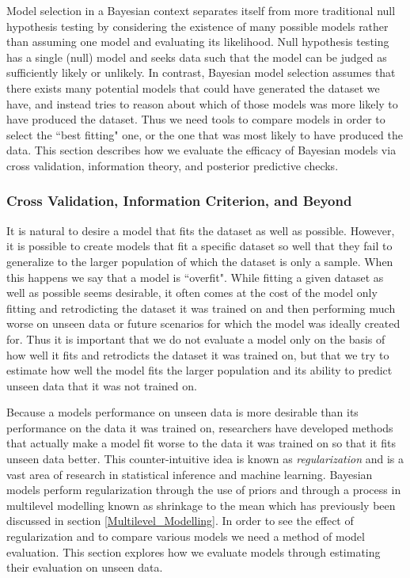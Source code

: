Model selection in a Bayesian context separates itself from more traditional null hypothesis testing by considering the existence of many possible models rather than assuming one model and evaluating its likelihood. Null hypothesis testing has a single (null) model and seeks data such that the model can be judged as sufficiently likely or unlikely. In contrast, Bayesian model selection assumes that there exists many potential models that could have generated the dataset we have, and instead tries to reason about which of those models was more likely to have produced the dataset. Thus we need tools to compare models in order to select the ``best fitting" one, or the one that was most likely to have produced the data. This section describes how we evaluate the efficacy of Bayesian models via cross validation, information theory, and posterior predictive checks.

\subsubsection{Cross Validation, Information Criterion, and Beyond}
It is natural to desire a model that fits the dataset as well as possible. However, it is possible to create models that fit a specific dataset so well that they fail to generalize to the larger population of which the dataset is only a sample. When this happens we say that a model is ``overfit". While fitting a given dataset as well as possible seems desirable, it often comes at the cost of the model only fitting and retrodicting the dataset it was trained on and then performing much worse on unseen data or future scenarios for which the model was ideally created for. Thus it is important that we do not evaluate a model only on the basis of how well it fits and retrodicts the dataset it was trained on, but that we try to estimate how well the model fits the larger population and its ability to predict unseen data that it was not trained on.

Because a models performance on unseen data is more desirable than its performance on the data it was trained on, researchers have developed methods that actually make a model fit worse to the data it was trained on so that it fits unseen data better. This counter-intuitive idea is known as \textit{regularization} and is a vast area of research in statistical inference and machine learning. Bayesian models perform regularization through the use of priors and through a process in multilevel modelling known as shrinkage to the mean which has previously been discussed in section \ref{Multilevel_Modelling}. In order to see the effect of regularization and to compare various models we need a method of model evaluation. This section explores how we evaluate models through estimating their evaluation on unseen data.


